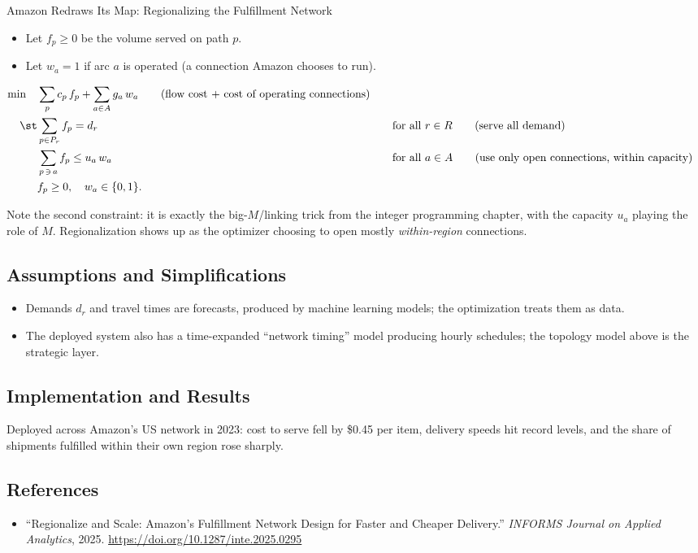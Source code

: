 \begin{casestudybox}{Amazon Redraws Its Map: Regionalizing the Fulfillment Network}
\begin{itemize}
\item Let $f_p \geq 0$ be the volume served on path $p$.
\item Let $w_a = 1$ if arc $a$ is operated (a connection Amazon chooses to run).
\end{itemize}

\begin{align*}
\min \quad & \sum_{p} c_p\, f_p + \sum_{a \in A} g_a\, w_a   \tag{flow cost + cost of operating connections} \\
\st        & \sum_{p \in P_r} f_p = d_r &&\quad \text{for all } r \in R   \tag{serve all demand} \\
           & \sum_{p \,\ni\, a} f_p \leq u_a\, w_a &&\quad \text{for all } a \in A   \tag{use only open connections, within capacity} \\
           & f_p \geq 0, \quad w_a \in \{0,1\}.
\end{align*}

Note the second constraint: it is exactly the big-$M$/linking trick from the integer programming chapter, with the capacity $u_a$ playing the role of $M$.  Regionalization shows up as the optimizer choosing to open mostly \emph{within-region} connections.

\subsection*{Assumptions and Simplifications}
\begin{itemize}
\item Demands $d_r$ and travel times are forecasts, produced by machine learning models; the optimization treats them as data.
\item The deployed system also has a time-expanded ``network timing'' model producing hourly schedules; the topology model above is the strategic layer.
\end{itemize}

\subsection*{Implementation and Results}
Deployed across Amazon's US network in 2023: cost to serve fell by \$0.45 per item, delivery speeds hit record levels, and the share of shipments fulfilled within their own region rose sharply.

\subsection*{References}
\begin{itemize}
\item ``Regionalize and Scale: Amazon's Fulfillment Network Design for Faster and Cheaper Delivery.'' \emph{INFORMS Journal on Applied Analytics}, 2025. \url{https://doi.org/10.1287/inte.2025.0295}
\end{itemize}
\end{casestudybox}

